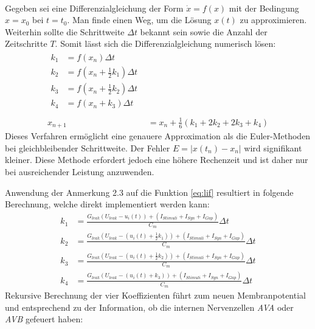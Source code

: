 	\begin{remark}\\
		Gegeben sei eine Differenzialgleichung der Form $\dot{x} = f(x)$ mit der Bedingung $x = x_0$ bei $t = t_0$. Man finde einen Weg, um die Lösung $x(t)$ zu approximieren.\\
		Weiterhin sollte die Schrittweite $\Delta t$ bekannt sein sowie die Anzahl der Zeitschritte $T$. Somit lässt sich die Differenzialgleichung numerisch lösen:
		\begin{align}
			\begin{split}
			\label{eq:runkgekutta}
			k_1 &= f(x_n) \Delta t\\
			k_2 &= f(x_n + \tfrac{1}{2} k_1) \Delta t\\
			k_3 &= f(x_n + \tfrac{1}{2} k_2) \Delta t\\
			k_4 &= f(x_n + k_3) \Delta t\\
			\end{split}\\[10pt]
			x_{n+1} &= x_n + \tfrac{1}{6} (k_1 + 2 k_2 + 2 k_3 + k_4)
		\end{align}
		Dieses Verfahren ermöglicht eine genauere Approximation als die Euler-Methoden bei gleichbleibender Schrittweite. Der Fehler $E = |x(t_n)-x_n|$ wird signifikant kleiner. Diese Methode erfordert jedoch eine höhere Rechenzeit und ist daher nur bei ausreichender Leistung anzuwenden.
	\end{remark}
	Anwendung der Anmerkung 2.3 auf die Funktion \eqref{eq:lif} resultiert in folgende Berechnung, welche direkt implementiert werden kann:
	\begin{equation}
	\begin{split}
		\label{eq:runkgekutta_nn}
		k_1 &= \frac{G_{leak} (U_{leak} - u_i(t)) + (I_{Stimuli} + I_{Syn} + I_{Gap})}{C_m} \Delta t\\
		k_2 &= \frac{G_{leak} (U_{leak} - (u_i(t) + \tfrac{1}{2} k_1)) + (I_{Stimuli} + I_{Syn} + I_{Gap})}{C_m} \Delta t\\
		k_3 &= \frac{G_{leak} (U_{leak} - (u_i(t) + \tfrac{1}{2} k_2)) + (I_{Stimuli} + I_{Syn} + I_{Gap})}{C_m} \Delta t\\
		k_4 &= \frac{G_{leak} (U_{leak} - (u_i(t) + k_3)) + (I_{Stimuli} + I_{Syn} + I_{Gap})}{C_m} \Delta t
	\end{split}
	\end{equation}
	Rekursive Berechnung der vier Koeffizienten führt zum neuen Membranpotential und entsprechend zu der Information, ob die internen Nervenzellen \textit{AVA} oder \textit{AVB} gefeuert haben:
